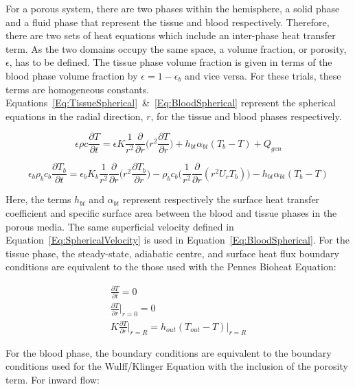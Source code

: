 \documentclass[11pt,english,a4paper,twoside,openright]{report}
\begin{document}
{{{{{{{{For a porous system, there are two phases within the hemisphere, a solid phase and a fluid phase that represent the tissue and blood respectively. Therefore, there are two sets of heat equations which include an inter-phase heat transfer term. As the two domains occupy the same space, a volume fraction, or porosity, $\epsilon$, has to be defined. The tissue phase volume fraction is given in terms of the blood phase volume fraction by $\epsilon=1-\epsilon_{b}$ and vice versa. For these trials, these terms are homogeneous constants. Equations~\ref{Eq:TissueSpherical}~\&~\ref{Eq:BloodSpherical} represent the spherical equations in the radial direction, $r$, for the tissue and blood phases respectively.

\begin{equation}
\epsilon\rho c\frac{\partial T}{\partial t} = \epsilon K\frac{1}{r^{2}}\frac{\partial}{\partial r}\bigg(r^{2}\frac{\partial T}{\partial r}\bigg) + h_{bt}\alpha_{bt}(T_{b}-T) + Q_{gen}
\label{Eq:TissueSpherical}
\end{equation}

\begin{equation}
\epsilon_{b}\rho_{b}c_{b}\frac{\partial T_{b}}{\partial t} = \epsilon_{b}K_{b}\frac{1}{r^{2}}\frac{\partial}{\partial r}\bigg(r^{2}\frac{\partial T_{b}}{\partial r}\bigg)-\rho_{b}c_{b}\bigg(\frac{1}{r^{2}}\frac{\partial}{\partial r}(r^{2}U_{r}T_{b}) \bigg)-h_{bt}\alpha_{bt}(T_{b}-T)
\label{Eq:BloodSpherical}
\end{equation}

Here, the terms $h_{bt}$ and $\alpha_{bt}$ represent respectively the surface heat transfer coefficient and specific surface area between the blood and tissue phases in the porous media. The same superficial velocity defined in Equation~\ref{Eq:SphericalVelocity} is used in Equation~\ref{Eq:BloodSpherical}. For the tissue phase, the steady-state, adiabatic centre, and surface heat flux boundary conditions are equivalent to the those used with the Pennes Bioheat Equation:

\begin{gather}
\frac{\partial T}{\partial t} = 0 \\
\frac{\partial T}{\partial r}\biggr|_{r=0} = 0 \\
K\frac{\partial T}{\partial r}\biggr|_{r=R} = h_{out}(T_{out}-T)\bigr|_{r=R}
\end{gather}

For the blood phase, the boundary conditions are equivalent to the boundary conditions used for the Wulff/Klinger Equation with the inclusion of the porosity term. For inward flow: 

}}}}}}}}
\end{document}
